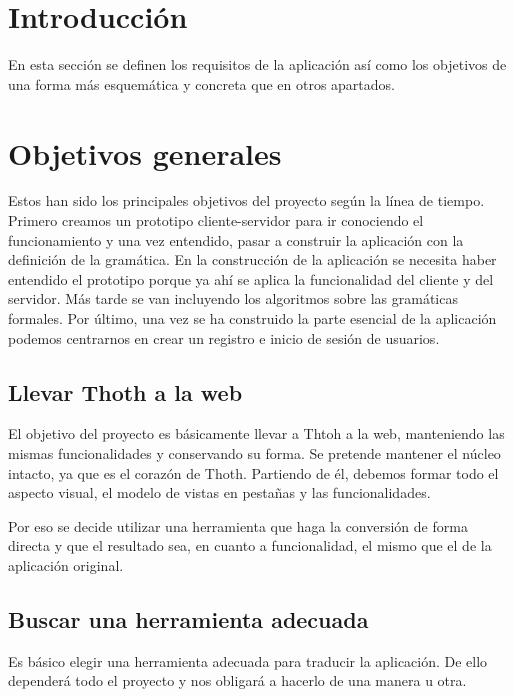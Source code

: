 
\section{Introducción}

En esta sección se definen los requisitos de la aplicación así como los objetivos de una forma más esquemática y concreta que en otros apartados.

\section{Objetivos generales}

Estos han sido los principales objetivos del proyecto según la línea de tiempo. Primero creamos un prototipo cliente-servidor para ir conociendo el funcionamiento y una vez entendido, pasar a construir la aplicación con la definición de la gramática. En la construcción de la aplicación se necesita haber entendido el prototipo porque ya ahí se aplica la funcionalidad del cliente y del servidor. Más tarde se van incluyendo los algoritmos sobre las gramáticas formales. Por último, una vez se ha construido la parte esencial de la aplicación podemos centrarnos en crear un registro e inicio de sesión de usuarios.

\subsection{Llevar Thoth a la web}

El objetivo del proyecto es básicamente llevar a Thtoh a la web, manteniendo las mismas funcionalidades y conservando su forma. Se pretende mantener el núcleo intacto, ya que es el corazón de Thoth. Partiendo de él, debemos formar todo el aspecto visual, el modelo de vistas en pestañas y las funcionalidades.

Por eso se decide utilizar una herramienta que haga la conversión de forma directa y que el resultado sea, en cuanto a funcionalidad, el mismo que el de la aplicación original.

\subsection{Buscar una herramienta adecuada}

Es básico elegir una herramienta adecuada para traducir la aplicación. De ello dependerá todo el proyecto y nos obligará a hacerlo de una manera u otra.

